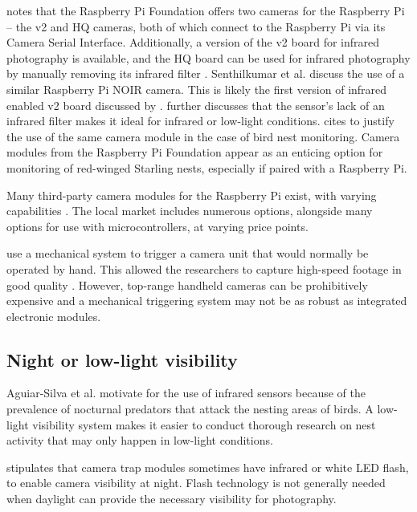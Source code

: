 \documentclass[class=report,11pt,crop=false]{standalone}
\begin{document}
\cite{jolles2021broad-scale} notes that the Raspberry Pi Foundation offers two cameras for the Raspberry Pi -- the v2 and HQ cameras, both of which connect to the Raspberry Pi via its Camera Serial Interface. Additionally, a version of the v2 board for infrared photography is available, and the HQ board can be used for infrared photography by manually removing its infrared filter \cite{jolles2021broad-scale}. Senthilkumar et al. \cite{senthilkumar2014embedded} discuss the use of a similar Raspberry Pi NOIR camera. This is likely the first version of infrared enabled v2 board discussed by \cite{jolles2021broad-scale}. \cite{senthilkumar2014embedded} further discusses that the sensor's lack of an infrared filter makes it ideal for infrared or low-light conditions. \cite{prinz2016a} cites \cite{senthilkumar2014embedded} to justify the use of the same camera module in the case of bird nest monitoring. Camera modules from the Raspberry Pi Foundation appear as an enticing option for monitoring of red-winged Starling nests, especially if paired with a Raspberry Pi.

Many third-party camera modules for the Raspberry Pi exist, with varying capabilities \cite{jolles2021broad-scale}. The local market includes numerous options, alongside many options for use with microcontrollers, at varying price points.

\cite{rico-guevara2017bring} use a mechanical system to trigger a camera unit that would normally be operated by hand. This allowed the researchers to capture high-speed footage in good quality \cite{rico-guevara2017bring}. However, top-range handheld cameras can be prohibitively expensive and a mechanical triggering system may not be as robust as integrated electronic modules.

\subsection{Night or low-light visibility}

Aguiar-Silva et al. \cite{aguiar-silva2017camera} motivate for the use of infrared sensors because of the prevalence of nocturnal predators that attack the nesting areas of birds. A low-light visibility system makes it easier to conduct thorough research on nest activity that may only happen in low-light conditions.

\cite{rovero2013which} stipulates that camera trap modules sometimes have infrared or white LED flash, to enable camera visibility at night. Flash technology is not generally needed when daylight can provide the necessary visibility for photography.
\end{document}
